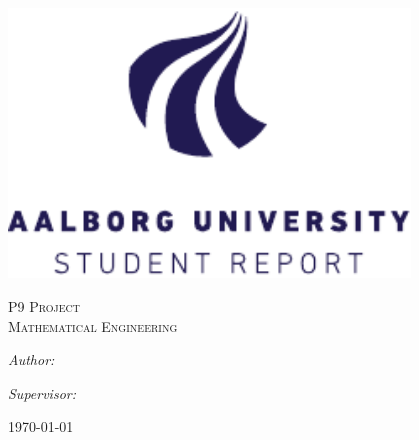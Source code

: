 
\begin{titlepage}
  \centering

  \vspace{2cm}

  {\huge\bfseries\projecttitle}
  
  
    
  \vspace{2cm}

  \includegraphics[width =0.8\textwidth]{incl/main/aau-report-badge.pdf}
  \vspace{1cm}
  
  \textsc{\LARGE P9 Project}\\
  \textsc{\Large Mathematical Engineering}


  \vspace{3cm}


  \begin{minipage}[t]{0.4\textwidth}
    \begin{flushleft}
      \large
      \emph{Author:}\\
      \projectauthors
    \end{flushleft}
  \end{minipage}
  \begin{minipage}[t]{0.4\textwidth}
    \begin{flushright}
      \large
      \emph{Supervisor:}\\
      \projectsupervisors
    \end{flushright}
  \end{minipage}

  \vfill

  {\large\today}
\end{titlepage}